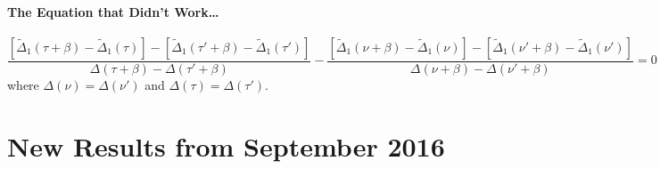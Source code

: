 \documentclass[12pt]{article}
\begin{document}
 \paragraph{The Equation that Didn't Work\ldots}
\[
  \frac{[\widetilde{\Delta}_1(\tau + \beta) - \widetilde{\Delta}_1(\tau)] - [\widetilde{\Delta}_1(\tau' + \beta) - \widetilde{\Delta}_1(\tau')]}{\Delta(\tau + \beta) - \Delta(\tau' + \beta)}
- \frac{[\widetilde{\Delta}_1(\nu + \beta) - \widetilde{\Delta}_1(\nu)] - [\widetilde{\Delta}_1(\nu' + \beta) - \widetilde{\Delta}_1(\nu')]}{\Delta(\nu + \beta) - \Delta(\nu' + \beta)} = 0
 \]
 where $\Delta(\nu) = \Delta(\nu')$ and $\Delta(\tau) = \Delta(\tau')$.
%


\section{New Results from September 2016}
\end{document}
